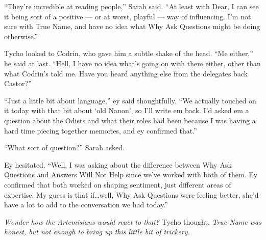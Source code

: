 ``They're incredible at reading people,'' Sarah said. ``At least with Dear, I can see it being sort of a positive — or at worst, playful — way of influencing. I'm not sure with True Name, and have no idea what Why Ask Questions might be doing otherwise.''

Tycho looked to Codrin, who gave him a subtle shake of the head. ``Me either,'' he said at last. ``Hell, I have no idea what's going on with them either, other than what Codrin's told me. Have you heard anything else from the delegates back Castor?''

``Just a little bit about language,'' ey said thoughtfully. ``We actually touched on it today with that bit about `old Nanon', so I'll write em back. I'd asked em a question about the Odists and what their roles had been because I was having a hard time piecing together memories, and ey confirmed that.''

``What sort of question?'' Sarah asked.

Ey hesitated. ``Well, I was asking about the difference between Why Ask Questions and Answers Will Not Help since we've worked with both of them. Ey confirmed that both worked on shaping sentiment, just different areas of expertise. My guess is that if\ldots well, Why Ask Questions were feeling better, she'd have a lot to add to the conversation we had today.''

\emph{Wonder how the Artemisians would react to that?} Tycho thought. \emph{True Name was honest, but not enough to bring up this little bit of trickery.}
